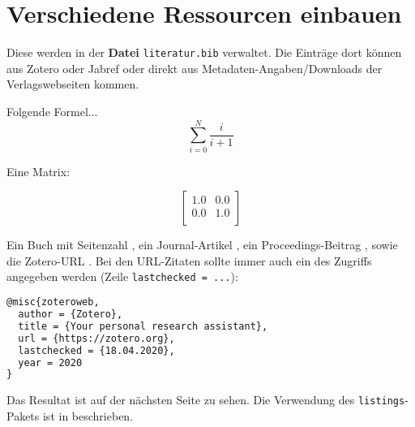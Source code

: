 \chapter{Verschiedene Ressourcen einbauen}

Diese werden in der \textbf{Datei} \texttt{literatur.bib} verwaltet. Die Einträge
dort können aus Zotero oder Jabref oder direkt aus Metadaten-Angaben/Downloads der Verlagswebseiten kommen.

Folgende Formel...  
$$
 \sum_{i=0}^N \frac{i}{i+1}
$$


Eine Matrix:

$$  
\left[\begin{array}{ll}
1.0	& 0.0 \\
0.0	& 1.0 \\
\end{array}
\right]
$$

\cite[Text als URL]{WillKurt.January312019}

Ein Buch mit Seitenzahl \cite[S. 34]{Balzert_etal2008}, ein Journal-Artikel \cite{Sperrvermerke_2015}, ein Proceedings-Beitrag \cite{Frantzi:1998:CMA:646631.696825}, sowie die Zotero-URL 
\cite{zoteroweb}. Bei den URL-Zitaten sollte immer auch ein  des Zugriffs angegeben werden (Zeile \texttt{lastchecked = ...}): 

\begin{lstlisting}[language=TeX]
@misc{zoteroweb,
  author = {Zotero},
  title = {Your personal research assistant},
  url = {https://zotero.org},
  lastchecked = {18.04.2020},
  year = 2020
}
\end{lstlisting}

Das Resultat ist auf der nächsten Seite zu sehen.
Die Verwendung des \texttt{listings}-Pakets ist in \cite{listingspkg} beschrieben.
